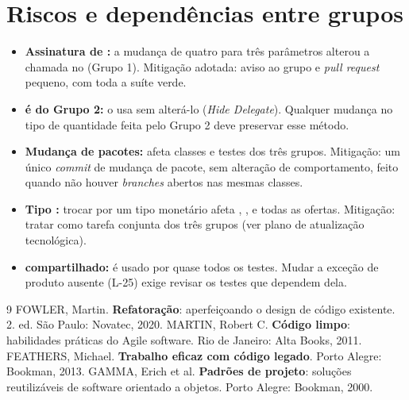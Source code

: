 \section{Riscos e depend\^encias entre grupos}
\begin{itemize}
\item \textbf{Assinatura de :} a mudan\c{c}a de quatro para tr\^es par\^ametros alterou a chamada no  (Grupo 1). Mitiga\c{c}\~ao adotada: aviso ao grupo e \textit{pull request} pequeno, com toda a su\'ite verde.
\item \textbf{ \'e do Grupo 2:} o  usa  sem alter\'a-lo (\textit{Hide Delegate}). Qualquer mudan\c{c}a no tipo de quantidade feita pelo Grupo 2 deve preservar esse m\'etodo.
\item \textbf{Mudan\c{c}a de pacotes:} afeta classes e testes dos tr\^es grupos. Mitiga\c{c}\~ao: um \'unico \textit{commit} de mudan\c{c}a de pacote, sem altera\c{c}\~ao de comportamento, feito quando n\~ao houver \textit{branches} abertos nas mesmas classes.
\item \textbf{Tipo :} trocar  por um tipo monet\'ario afeta , ,  e todas as ofertas. Mitiga\c{c}\~ao: tratar como tarefa conjunta dos tr\^es grupos (ver plano de atualiza\c{c}\~ao tecnol\'ogica).
\item \textbf{ compartilhado:} \'e usado por quase todos os testes. Mudar a exce\c{c}\~ao de produto ausente (L-25) exige revisar os testes que dependem dela.
\end{itemize}

\begin{thebibliography}{9}\small
{} FOWLER, Martin. \textbf{Refatora\c{c}\~ao}: aperfei\c{c}oando o design de c\'odigo existente. 2. ed. S\~ao Paulo: Novatec, 2020.
 MARTIN, Robert C. \textbf{C\'odigo limpo}: habilidades pr\'aticas do Agile software. Rio de Janeiro: Alta Books, 2011.
 FEATHERS, Michael. \textbf{Trabalho eficaz com c\'odigo legado}. Porto Alegre: Bookman, 2013.
 GAMMA, Erich et al. \textbf{Padr\~oes de projeto}: solu\c{c}\~oes reutiliz\'aveis de software orientado a objetos. Porto Alegre: Bookman, 2000.
\end{thebibliography}

